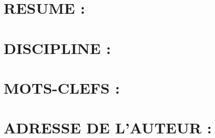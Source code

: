 \newpage

\section*{RESUME :}
\vfill

\section*{DISCIPLINE :}
\vfill

\section*{MOTS-CLEFS :}
\vfill

\section*{ADRESSE DE L'AUTEUR :}
\vfill
